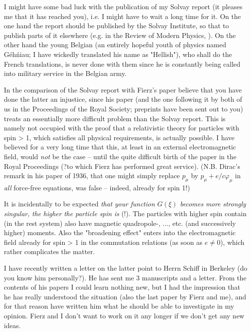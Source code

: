 I might have some bad luck with the publication of my Solvay report (it pleases me that it has reached you), i.e. I might have to wait a long time for it. On the one hand the report should be published by the Solvay Institute, so that  to publish parts of it elsewhere (e.g. in the Review of Modern Physics, ). On the other hand the young Belgian (an entirely hopeful youth of physics named G\'eh\'niau; I have wickedly translated his name as "Hellish"), who shall do the French translations, is never done with them since he is constantly being called into military service in the Belgian army.

In the comparison of the Solvay report with Fierz's paper believe that you have done the latter an injustice, since his paper (and the one following it by both of us in the Proceedings of the Royal Society; preprints have been sent out to you) treats an essentially more difficult problem than the Solvay report. This is namely not occupied with the proof that a relativistic theory for particles with spin > 1, which satisfies all physical requirements, is actually possible. I have believed for a very long time that this, at least in an external electromagnetic field, would \textit{not} be the case -- until the quite difficult birth of the paper in the Royal Proceedings (?{to which Fierz has performed great service}). (N.B. Dirac's remark in his paper of 1936, that one might simply replace $p_\mu$ by $p_\mu + e/c\varphi_\mu$ in \textit{all} force-free equations, was false -- indeed, already for spin 1!)

It is incidentally to be expected \textit{that your function $G(\xi)$ becomes more strongly singular, the higher the particle spin is} (!). The particles with higher spin contain (in the rest system) also have magnetic quadropole-, ..., etc. (and successively higher) moments. Also the "broadening effect" enters into the electromagnetic field already for spin > 1 in the commutation relations (as soon as $e\neq 0$), which rather complicates the matter.

I have recently written a letter on the latter point to Herrn Schiff in Berkeley (do you know him personally?). He has sent me 3 manuscripts and a letter. From the contents of his papers I could learn nothing new, but I had the impression that he has really understood the situation (also the last paper by Fierz and me), and for that reason have written him what he should be able to investigate in my opinion. Fierz and I don't want to work on it any longer if we don't get any new ideas.

